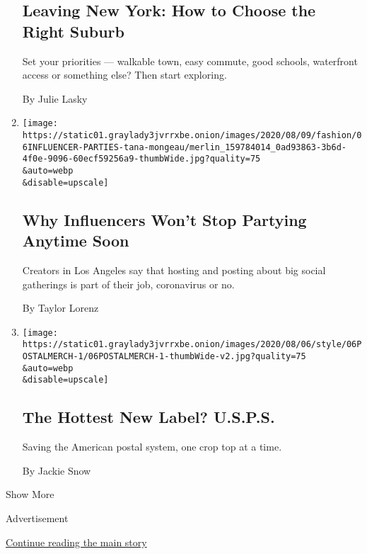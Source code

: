 \begin{enumerate}
{  \subsection{Leaving New York: How to Choose the Right
  Suburb}\label{leaving-new-york-how-to-choose-the-right-suburb}}

  Set your priorities --- walkable town, easy commute, good schools,
  waterfront access or something else? Then start exploring.

  By Julie Lasky
\item
  \href{/2020/08/06/style/influencer-parties-jake-paul-tana-mongeau-thomas-petrou-hype-house.html}{}

  \texttt{[image: https://static01.graylady3jvrrxbe.onion/images/2020/08/09/fashion/06INFLUENCER-PARTIES-tana-mongeau/merlin\_159784014\_0ad93863-3b6d-4f0e-9096-60ecf59256a9-thumbWide.jpg?quality=75\\\&auto=webp\\\&disable=upscale]}

  \hypertarget{why-influencers-wont-stop-partying-anytime-soon}{%
  \subsection{Why Influencers Won't Stop Partying Anytime
  Soon}\label{why-influencers-wont-stop-partying-anytime-soon}}

  Creators in Los Angeles say that hosting and posting about big social
  gatherings is part of their job, coronavirus or no.

  By Taylor Lorenz
\item
  \href{/2020/08/06/style/usps-store.html}{}

  \texttt{[image: https://static01.graylady3jvrrxbe.onion/images/2020/08/06/style/06POSTALMERCH-1/06POSTALMERCH-1-thumbWide-v2.jpg?quality=75\\\&auto=webp\\\&disable=upscale]}

  \hypertarget{the-hottest-new-label-usps-1}{%
  \subsection{The Hottest New Label?
  U.S.P.S.}\label{the-hottest-new-label-usps-1}}

  Saving the American postal system, one crop top at a time.

  By Jackie Snow
\end{enumerate}

Show More

Advertisement

\protect\hyperlink{after-mid7}{Continue reading the main story}

